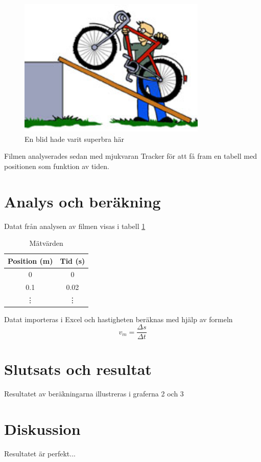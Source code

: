 \documentclass[11p, titlepage, oneside, a4paper]{article}
\begin{document}
        \begin{figure}[!h]
            \includegraphics[width=0.8\textwidth]{images/lutandePlan.jpg}
            \caption{En blid hade varit superbra här}
            \label{fig:lutandeplan}
        \end{figure}
        
        Filmen analyserades sedan med mjukvaran Tracker för att få fram en tabell med positionen som funktion av tiden.
    \newpage
	\section{Analys och beräkning}
        Datat från analysen av filmen visas i tabell \ref{table:result}
    
        
        \begin{table}
            \begin{center}
            \begin{tabular}{ |c|c| } 
                \hline
                Position (m) & Tid (s)  \\ 
                \hline
                0 & 0  \\ 
                0.1 & 0.02 \\
                \vdots & \vdots \\
                \hline
            \end{tabular}
                \caption{Mätvärden}
                \label{table:result}
            \end{center}
        \end{table}            
        

    Datat importeras i Excel och hastigheten beräknas med hjälp av formeln
    \begin{equation}
        v_m = \frac{\Delta s}{\Delta t}
    \end{equation}
    
    \section{Slutsats och resultat} 
        Resultatet av beräkningarna illustreras i graferna 2 och 3
    \section{Diskussion} 
    Resultatet är perfekt...

    
    \printbibliography
\end{document}
